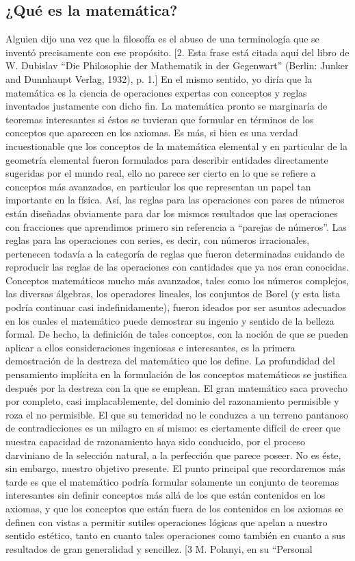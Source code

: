 \documentclass[a4paper, 12pt]{article}
\begin{document}
\subsection*{¿Qué es la matemática?}

Alguien dijo una vez que la filosofía es el abuso de una terminología que se inventó precisamente con ese propósito. [2. Esta frase está citada aquí del libro de  W. Dubislav ``Die Philosophie der Mathematik in der Gegenwart'' (Berlin: Junker and Dunnhaupt Verlag, 1932), p. 1.] En el mismo sentido, yo diría que la matemática es la ciencia de operaciones expertas con conceptos y reglas inventados justamente con dicho fin. La matemática pronto se marginaría de teoremas interesantes si éstos se tuvieran que formular en términos de los conceptos que aparecen en los axiomas. Es más, si bien es una verdad incuestionable que los conceptos de la matemática elemental y en particular de la geometría elemental fueron formulados para describir entidades directamente sugeridas por el mundo real, ello no parece ser cierto en lo que se refiere a conceptos más avanzados, en particular los que representan un papel tan importante en la física. Así, las reglas para las operaciones con pares de números están diseñadas obviamente para dar los mismos resultados que las operaciones con fracciones que aprendimos primero sin referencia a ``parejas de números''. Las reglas para las operaciones con series, es decir, con números irracionales, pertenecen todavía a la categoría de reglas que fueron determinadas cuidando de reproducir las reglas de las operaciones con cantidades que ya nos eran conocidas. Conceptos matemáticos mucho más avanzados, tales como los números complejos, las diversas álgebras, los operadores lineales, los conjuntos de Borel (y esta lista podría continuar casi indefinidamente), fueron ideados por ser asuntos adecuados en los cuales el matemático puede demostrar su ingenio y sentido de la belleza formal. De hecho, la definición de tales conceptos, con la noción de que se pueden aplicar a ellos consideraciones ingeniosas e interesantes, es la primera demostración de la destreza del matemático que los define. La profundidad del pensamiento implícita en la formulación de los conceptos matemáticos se justifica después por la destreza con la que se emplean. El gran matemático saca provecho por completo, casi implacablemente, del dominio del razonamiento permisible y roza el no permisible. El que su temeridad no le conduzca a un terreno pantanoso de contradicciones es un milagro en sí mismo: es ciertamente difícil de creer que nuestra capacidad de razonamiento haya sido conducido, por el proceso darviniano de la selección natural, a la perfección que parece poseer. No es éste, sin embargo, nuestro objetivo presente. El punto principal que recordaremos más tarde es que el matemático podría formular solamente un conjunto de teoremas interesantes sin definir conceptos más allá de los que están contenidos en los axiomas, y que los conceptos que están fuera de los contenidos en los axiomas se definen con vistas a permitir sutiles operaciones lógicas que apelan a nuestro sentido estético, tanto en cuanto tales operaciones como también en cuanto a sus resultados de gran generalidad y sencillez. [3 M. Polanyi, en su ``Personal 
\end{document}
